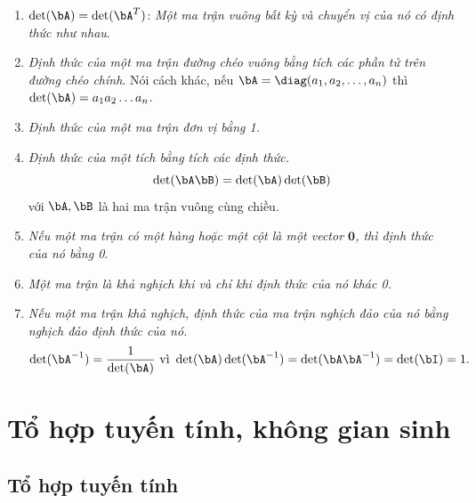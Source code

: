 \begin{enumerate}

    \item $\det(\bA) = \det(\bA^T)$: \textit{Một ma trận vuông bất kỳ và chuyển vị của
    nó có định thức như nhau}.

    \item \textit{Định thức của một ma trận đường chéo vuông bằng tích các
    phần tử trên đường chéo chính}. Nói cách khác, nếu $\bA = \diag(a_1, a_2, \dots, a_n)$
    thì $\det(\bA) = a_1a_2\dots a_n$.

    \item \textit{Định thức của một ma trận đơn vị bằng 1.}

    \item \textit{Định thức của một tích bằng tích các định thức.}
    \begin{equation}
        \det(\bA\bB) = \det(\bA) \det(\bB)
    \end{equation}
    với $\bA, \bB$ là hai ma trận vuông cùng chiều.


    \item \textit{Nếu một ma trận có một hàng hoặc một cột là một vector
    $\mathbf{0}$, thì định thức của nó bằng 0}.


    \item \textit{Một ma trận là khả nghịch khi và chỉ khi định thức của nó
    khác 0.}


    \item \textit{Nếu một ma trận khả nghịch, định thức của ma trận nghịch đảo
    của nó bằng nghịch đảo định thức của nó.}
    \begin{equation}
        \det(\bA^{-1})    = \frac{1}{\det(\bA)} ~\text{vì}~ \det(\bA) \det(\bA^
        {-1}) = \det(\bA \bA^{-1}) = \det(\bI) = 1.
    \end{equation}



\end{enumerate}




\section{Tổ hợp tuyến tính, không gian sinh} %
\label{sec:to_hop_tuyen_tinh_khong_gian_sinh}

\subsection{Tổ hợp tuyến tính} %
\label{sub:to_hop_tuyen_tinh}

